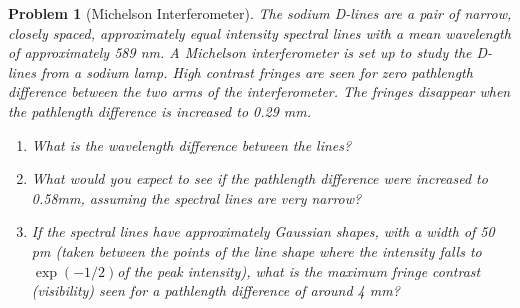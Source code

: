 \documentclass[a4paper]{article}
\theoremstyle{new}
\newtheorem{qns}{Problem}[section]
\begin{document}
\begin{qns}[Michelson Interferometer]
The sodium D-lines are a pair of narrow, closely spaced, approximately equal intensity spectral lines with a mean wavelength of approximately 589 nm. A Michelson interferometer is set up to study the D-lines from a sodium lamp. High contrast fringes are seen for zero pathlength difference between the two arms of the interferometer. The fringes disappear when the pathlength difference is increased to 0.29 mm.
\begin{enumerate}[label=(\alph*)]
    \item What is the wavelength difference between the lines?
    \item What would you expect to see if the pathlength difference were increased to 0.58mm, assuming the spectral lines are very narrow?
    \item If the spectral lines have approximately Gaussian shapes, with a width of 50 pm (taken between the points of the line shape where the intensity falls to $\exp(-1/2)$of the peak intensity), what is the maximum fringe contrast (visibility) seen for a pathlength difference of around 4 mm?
\end{enumerate}
\end{qns}
\end{document}
